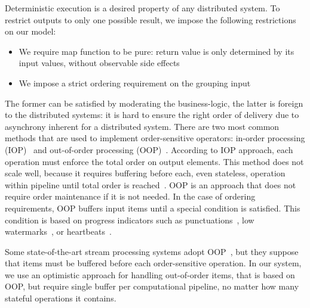 \label {fs-collision}

Deterministic execution is a desired property of any distributed system. 
%
To restrict outputs to only one possible result, we impose the following  restrictions on our model: 

\begin{itemize}
  \item We require map function to be pure: return value is only determined by its input values, without observable side effects
  \item We impose a strict ordering requirement on the grouping  input
\end{itemize}

The former   can be  satisfied by moderating the  business-logic, 
the latter  is foreign to the distributed systems: 
it is hard to ensure  the right order of delivery due to  asynchrony inherent for a distributed system. 
There are two most common methods that are used to implement order-sensitive operators: in-order processing (IOP)~\cite{Arasu:2006:CCQ:1146461.1146463, Cranor:2003:GSD:872757.872838} and out-of-order processing (OOP)~\cite{Li:2008:OPN:1453856.1453890}. According to IOP approach, each operation must enforce the total order on output elements. This method does not scale well, because it requires buffering before each, even stateless, operation within pipeline until total order is reached~\cite{Li:2008:OPN:1453856.1453890}. OOP is an approach that does not require order maintenance if it is not needed. In the case of ordering requirements, OOP buffers input items until a special condition is satisfied. This condition is based on progress indicators such as punctuations~\cite{Tucker:2003:EPS:776752.776780}, low watermarks~\cite{Akidau:2013:MFS:2536222.2536229}, or heartbeats~\cite{Srivastava:2004:FTM:1055558.1055596}.  

Some state-of-the-art stream processing systems adopt OOP~\cite{Carbone:2017:SMA:3137765.3137777}, but they suppose that items must be buffered before each order-sensitive operation. In our system, we use an optimistic approach for handling out-of-order items, that is based on OOP, but require single buffer per computational pipeline, no matter how many stateful operations it contains.
%
%

